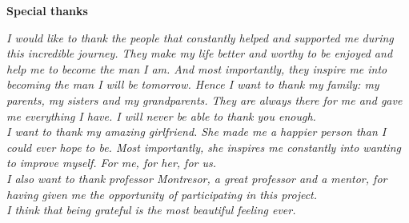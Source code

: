 \thispagestyle{empty}

\begin{center}
  {\bf \Huge Special thanks}
\end{center}

\vspace{4cm}


\emph{
  I would like to thank the people that constantly helped and supported me during this incredible journey. They make my life better and worthy to be enjoyed and help me to become the man I am. And most importantly, they inspire me into becoming the man I will be tomorrow. Hence I want to thank my family: my parents, my sisters and my grandparents. They are always there for me and gave me everything I have. I will never be able to thank you enough.\\
  I want to thank my amazing girlfriend. She made me a happier person than I could ever hope to be. Most importantly, she inspires me constantly into wanting to improve myself. For me, for her, for us.\\
  I also want to thank professor Montresor, a great professor and a mentor, for having given me the opportunity of participating in this project.\\
  I think that being grateful is the most beautiful feeling ever.
}
